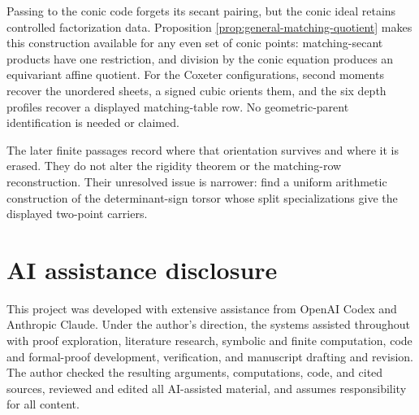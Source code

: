 \documentclass[11pt]{article}
\theoremstyle{definition}
\theoremstyle{remark}
\begin{document}
Passing to the conic code forgets its secant pairing, but the conic ideal
retains controlled factorization data.  Proposition
\ref{prop:general-matching-quotient} makes this construction available for
any even set of conic points: matching-secant products have one
restriction, and division by the conic equation produces an equivariant
affine quotient.  For the Coxeter configurations, second moments recover
the unordered sheets, a signed cubic orients them, and the six depth
profiles recover a displayed matching-table row.  No geometric-parent
identification is needed or claimed.

The later finite passages record where that orientation survives and
where it is erased.  They do not alter the rigidity theorem or the
matching-row reconstruction.  Their unresolved issue is narrower: find a
uniform arithmetic construction of the determinant-sign torsor whose
split specializations give the displayed two-point carriers.

\section*{AI assistance disclosure}

This project was developed with extensive assistance from OpenAI Codex and
Anthropic Claude. Under the author's direction, the systems assisted
throughout with proof exploration, literature research, symbolic and finite
computation, code and formal-proof development, verification, and manuscript
drafting and revision. The author checked the resulting arguments,
computations, code, and cited sources, reviewed and edited all AI-assisted
material, and assumes responsibility for all content.
\end{document}
